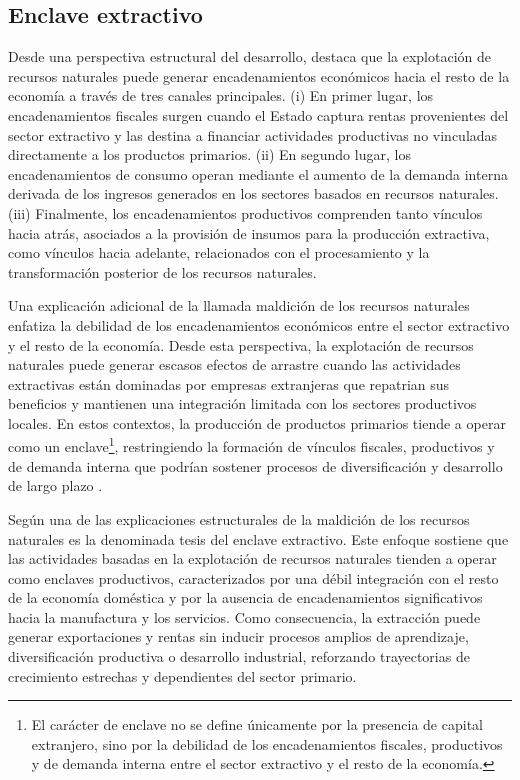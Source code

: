 \documentclass[../../TFM.tex]{subfiles}
\begin{document}
	\subsection{Enclave extractivo}
	\label{subsec:enclave-extractivo}
	
	Desde una perspectiva estructural del desarrollo, \textcite{Hirschman1981} destaca que la explotación de recursos naturales puede generar encadenamientos económicos hacia el resto de la economía a través de tres canales principales. (i) En primer lugar, los encadenamientos fiscales surgen cuando el Estado captura rentas provenientes del sector extractivo y las destina a financiar actividades productivas no vinculadas directamente a los productos primarios. (ii) En segundo lugar, los encadenamientos de consumo operan mediante el aumento de la demanda interna derivada de los ingresos generados en los sectores basados en recursos naturales. (iii) Finalmente, los encadenamientos productivos comprenden tanto vínculos hacia atrás, asociados a la provisión de insumos para la producción extractiva, como vínculos hacia adelante, relacionados con el procesamiento y la transformación posterior de los recursos naturales.
	
	Una explicación adicional de la llamada maldición de los recursos naturales enfatiza la debilidad de los encadenamientos económicos entre el sector extractivo y el resto de la economía. Desde esta perspectiva, la explotación de recursos naturales puede generar escasos efectos de arrastre cuando las actividades extractivas están dominadas por empresas extranjeras que repatrian sus beneficios y mantienen una integración limitada con los sectores productivos locales. En estos contextos, la producción de productos primarios tiende a operar como un enclave\footnote{El carácter de enclave no se define únicamente por la presencia de capital extranjero, sino por la debilidad de los encadenamientos fiscales, productivos y de demanda interna entre el sector extractivo y el resto de la economía.}, restringiendo la formación de vínculos fiscales, productivos y de demanda interna que podrían sostener procesos de diversificación y desarrollo de largo plazo \parencite{Hirschman1958}.
	
	Según \textcite{Ross1999} una de las explicaciones estructurales de la maldición de los recursos naturales es la denominada tesis del enclave extractivo. Este enfoque sostiene que las actividades basadas en la explotación de recursos naturales tienden a operar como enclaves productivos, caracterizados por una débil integración con el resto de la economía doméstica y por la ausencia de encadenamientos significativos hacia la manufactura y los servicios. Como consecuencia, la extracción puede generar exportaciones y rentas sin inducir procesos amplios de aprendizaje, diversificación productiva o desarrollo industrial, reforzando trayectorias de crecimiento estrechas y dependientes del sector primario.
	
\end{document}
